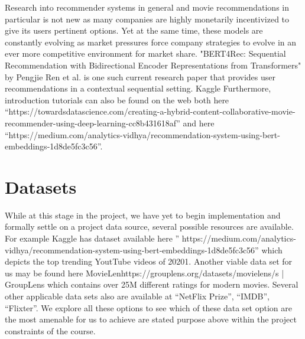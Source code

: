 \documentclass[10pt,twocolumn,letterpaper]{article}
\begin{document}
Research into recommender systems in general and movie recommendations in particular is not new as many companies are highly monetarily incentivized to give its users pertinent options.  Yet at the same time, these models are constantly evolving as market pressures force company strategies to evolve in an ever more competitive environment for market share. "BERT4Rec: Sequential Recommendation with Bidirectional Encoder Representations from Transformers" by Pengjie Ren et al. is one such current research paper that provides user recommendations in a contextual sequential setting.  Kaggle  Furthermore, introduction tutorials can also be found on the web both here “https://towardsdatascience.com/creating-a-hybrid-content-collaborative-movie-recommender-using-deep-learning-cc8b431618af” and here “https://medium.com/analytics-vidhya/recommendation-system-using-bert-embeddings-1d8de5fc3c56”.


\section{Datasets}

While at this stage in the project, we have yet to begin implementation and formally settle on a project data source, several possible resources are available.  For example Kaggle has dataset available here ” https://medium.com/analytics-vidhya/recommendation-system-using-bert-embeddings-1d8de5fc3c56” which depicts the top trending YoutTube videos of 20201.  Another viable data set for us may be found here MovieLenhttps://grouplens.org/datasets/movielens/s | GroupLens which contains over 25M different ratings for modern movies.  Several other applicable data sets also are available at “NetFlix Prize”, “IMDB”, “Flixter”.  We explore all these options to see which of these data set option are the most amenable for us to achieve are stated purpose above within the project constraints of the course.
\end{document}
